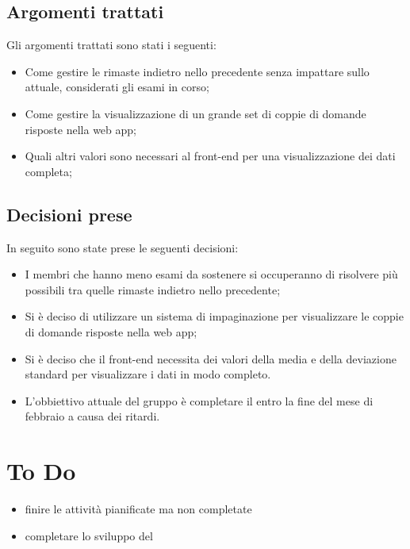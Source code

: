 \documentclass[a4paper, 12pt]{article}
\begin{document}
\subsection{Argomenti trattati}
Gli argomenti trattati sono stati i seguenti:
\begin{itemize}
    \item Come gestire le  rimaste indietro nello  precedente senza impattare sullo  attuale, considerati gli esami in corso;
    \item Come gestire la visualizzazione di un grande set di coppie di domande risposte nella web app;
    \item Quali altri valori sono necessari al front-end per una visualizzazione dei dati completa;
\end{itemize}

\subsection{Decisioni prese}
In seguito sono state prese le seguenti decisioni:
\begin{itemize}
    \item I membri che hanno meno esami da sostenere si occuperanno di risolvere più  possibili tra quelle rimaste indietro nello  precedente;
    \item Si è deciso di utilizzare un sistema di impaginazione per visualizzare le coppie di domande risposte nella web app;
    \item Si è deciso che il front-end necessita dei valori della media e della deviazione standard per visualizzare i dati in modo completo.
    \item L'obbiettivo attuale del gruppo è completare il  entro la fine del mese di febbraio a causa dei ritardi.
\end{itemize}

\section{To Do}
\begin{itemize}
    \item finire le attività pianificate ma non completate
    \item completare lo sviluppo del 
\end{itemize}
\end{document}
